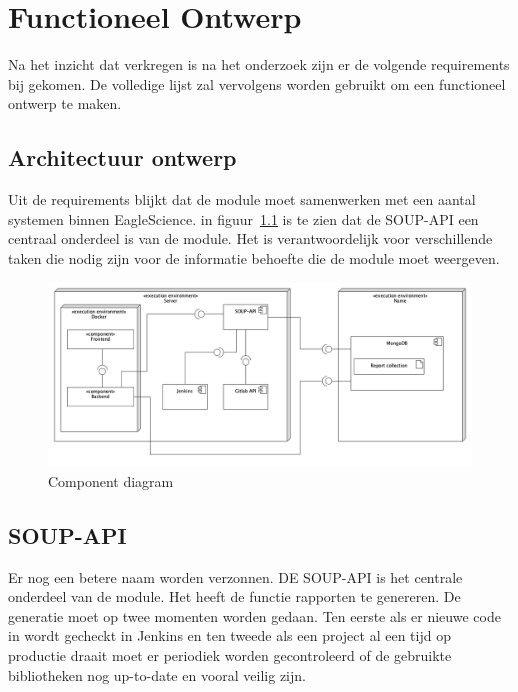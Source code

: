 \chapter{Functioneel Ontwerp}\label{ch:functioneel-ontwerp} %

\label{funtioneelOntwerp} %

Na het inzicht dat verkregen is na het onderzoek zijn er de volgende requirements bij gekomen.
De volledige lijst zal vervolgens worden gebruikt om een functioneel ontwerp te maken.


\section{Architectuur ontwerp}\label{sec:architectuur-ontwerp}
Uit de requirements blijkt dat de module moet samenwerken met een aantal systemen binnen EagleScience. in figuur~\ref{fig:UML-ComponentDiagram} is te zien dat de SOUP-API een centraal onderdeel is van de module. Het is verantwoordelijk voor verschillende taken die nodig zijn voor de informatie behoefte die de module moet weergeven.

\begin{figure}[bth]
    \myfloatalign
    \includegraphics[width=15cm]{gfx/UMLcomponent diagram}
    \caption{Component diagram}
    \label{fig:UML-ComponentDiagram}
\end{figure}

\section{SOUP-API}\label{sec:soup-api}
Er  nog een betere naam worden verzonnen.
DE SOUP-API is het centrale onderdeel van de module. Het heeft de functie rapporten te genereren. De generatie moet op twee momenten worden gedaan. Ten eerste als er nieuwe code in wordt gecheckt in Jenkins en ten tweede als een project al een tijd op productie draait moet er periodiek worden gecontroleerd of de gebruikte bibliotheken nog up-to-date en vooral veilig zijn.

